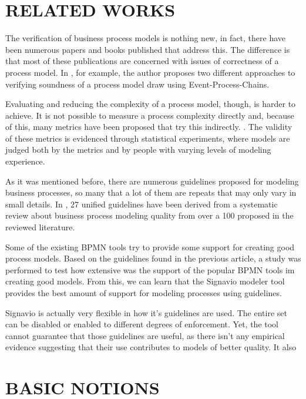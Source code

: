 \documentclass[a4paper,twoside]{article}
\begin{document}
\section{RELATED WORKS}\label{RelatedWorks}


\noindent The verification of business process models is nothing new, in fact, there have been numerous papers and books published that address this. The difference is that most of these publications are concerned with issues of correctness of a process model. In \cite{Mendling2008}, for example, the author proposes two different approaches to verifying soundness of a process model draw using Event-Process-Chains.
	
Evaluating and reducing the complexity of a process model, though, is harder to achieve. It is not possible to measure a process complexity directly and, because of this, many metrics have been proposed that try this indirectly. \cite{?}. The validity of these metrics is evidenced through statistical experiments, where models are judged both by the metrics and by people with varying levels of modeling experience.

As it was mentioned before, there are numerous guidelines proposed for modeling business processes, so many that a lot of them are repeats that may only vary in small details. In \cite{Moreno-MontesdeOca2014}, 27 unified guidelines have been derived from a systematic review about business process modeling quality from over a 100 proposed in the reviewed literature. 

Some of the existing BPMN tools try to provide some support for creating good process models. Based on the guidelines found in the previous article, a study \cite{MoniqueSnoeckIsel2015} was performed to test how extensive was the support of the popular BPMN tools im creating good models. From this, we can learn that the Signavio modeler tool provides the best amount of support for modeling processes using guidelines. 

Signavio is actually very flexible in how it's guidelines are used. The entire set can be disabled or enabled to different degrees of enforcement. Yet, the tool cannot guarantee that those guidelines are useful, as there isn't any empirical evidence suggesting that their use contributes to models of better quality. It also 

\section{BASIC NOTIONS}\label{Fundamentals}\label{Background}
\end{document}
